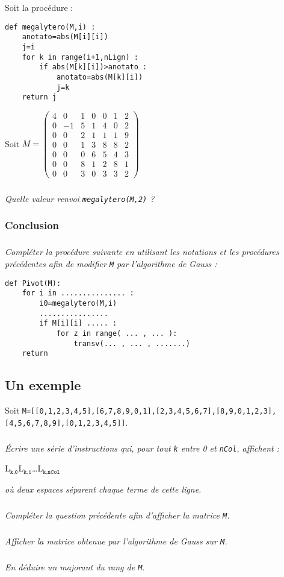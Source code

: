 \documentclass[10pt,oneside]{article}
\begin{document}
\setlength{\columnseprule}{.2pt}

Soit la procédure :
\begin{minipage}[c]{.47\linewidth}
\begin{verbatim}
def megalytero(M,i) :
    anotato=abs(M[i][i])
    j=i
    for k in range(i+1,nLign) :
        if abs(M[k][i])>anotato :
            anotato=abs(M[k][i])
            j=k
    return j
\end{verbatim}
\end{minipage}\hfill
\begin{minipage}[c]{.47\linewidth}
 Soit $M = \begin{pmatrix}
4&0&1&0&0&1&2\\0&-1&5&1&4&0&2\\0&0&2&1&1&1&9\\0&0&1&3&8&8&2\\0&0&0&6&5&4&3\\0&0&8&1&2&8&1\\0&0&3&0&3&3&2 \end{pmatrix}$
\end{minipage}

\subparagraph{}
\textit{Quelle valeur renvoi  \texttt{megalytero(M,2)} ?}



\subsubsection*{Conclusion}


\subparagraph{}
\textit{Compléter la procédure suivante en utilisant les notations et les procédures précédentes afin de modifier \texttt{M} par l'algorithme de Gauss :}
%
\begin{verbatim}
def Pivot(M):
    for i in ............... :
        i0=megalytero(M,i)
        ................
        if M[i][i] ..... : 
            for z in range( ... , ... ):
                transv(... , ... , .......)
    return
\end{verbatim}

\subsection*{Un exemple}




Soit \texttt{M=[[0,1,2,3,4,5],[6,7,8,9,0,1],[2,3,4,5,6,7],[8,9,0,1,2,3],[4,5,6,7,8,9],[0,1,2,3,4,5]]}.

\subparagraph{}
\textit{Écrire une série d'instructions qui, pour tout \texttt{k} entre 0 et \texttt{nCol}, affichent :}

\hfil L$_\texttt{k,0}$\qquad L$_\texttt{k,1}$\qquad\ldots\qquad L$_\texttt{k,nCol}$

\textit{où deux espaces séparent chaque terme de cette ligne.}

\subparagraph{}
\textit{Compléter la question précédente afin d'afficher la matrice \texttt{M}.}

\subparagraph{}
\textit{Afficher la matrice obtenue par l'algorithme de Gauss sur \texttt{M}.}

\subparagraph{}
\textit{En déduire un majorant du rang de \texttt{M}.}
\end{document}
